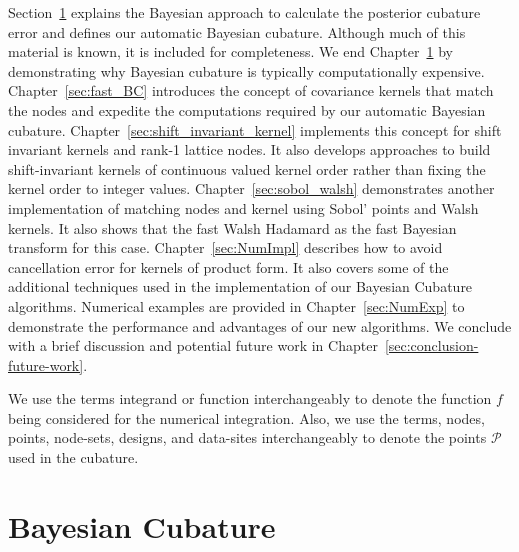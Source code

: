\documentclass{svjour3}                     %
\begin{document}
Section~\ref{sec:BC} explains the Bayesian approach to calculate the posterior cubature error and defines our automatic Bayesian cubature. Although much of this material is known, it is included for completeness.  We end Chapter~\ref{sec:BC}  by demonstrating why Bayesian cubature is typically computationally expensive.
Chapter~\ref{sec:fast_BC}  introduces the concept of covariance kernels that match the nodes and expedite the computations required by our automatic Bayesian cubature. 
Chapter~\ref{sec:shift_invariant_kernel} implements this concept for shift invariant kernels and rank-1 lattice nodes. It also develops approaches to build shift-invariant kernels of continuous valued kernel order rather than fixing the kernel order to integer values.
Chapter~\ref{sec:sobol_walsh} demonstrates another implementation of matching nodes and kernel using Sobol' points and Walsh kernels. It also shows that the fast Walsh Hadamard as the fast Bayesian transform for this case.
Chapter~\ref{sec:NumImpl} describes how to avoid cancellation error for kernels of product form. 
It also covers  some of the additional techniques used in the implementation of our Bayesian Cubature algorithms. 
Numerical examples are provided in Chapter~\ref{sec:NumExp} to demonstrate the performance and advantages of our new algorithms.  We conclude with a brief discussion and potential future work in Chapter~\ref{sec:conclusion-future-work}.


We use the terms integrand or function interchangeably to denote the function $f$ being considered for the numerical integration. Also, we use the terms, nodes, points, node-sets, designs, and data-sites interchangeably to denote the points $\mathcal{P}$ used in the cubature.






















\section{Bayesian Cubature}
\label{sec:BC} 
\end{document}
